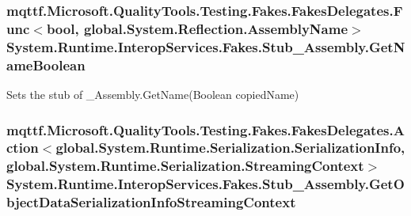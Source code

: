 \hypertarget{class_system_1_1_runtime_1_1_interop_services_1_1_fakes_1_1_stub___assembly_a039a10b8a1983925556ab1dda25231b8}{
\subsubsection[{Get\-Name\-Boolean}]{\setlength{\rightskip}{0pt plus 5cm}mqttf.\-Microsoft.\-Quality\-Tools.\-Testing.\-Fakes.\-Fakes\-Delegates.\-Func$<$bool, global.\-System.\-Reflection.\-Assembly\-Name$>$ System.\-Runtime.\-Interop\-Services.\-Fakes.\-Stub\-\_\-\-Assembly.\-Get\-Name\-Boolean}}\label{class_system_1_1_runtime_1_1_interop_services_1_1_fakes_1_1_stub___assembly_a039a10b8a1983925556ab1dda25231b8}


Sets the stub of \-\_\-\-Assembly.\-Get\-Name(\-Boolean copied\-Name)

\hypertarget{class_system_1_1_runtime_1_1_interop_services_1_1_fakes_1_1_stub___assembly_a97a43284d8c0ae3d29f00a837f759904}{
\subsubsection[{Get\-Object\-Data\-Serialization\-Info\-Streaming\-Context}]{\setlength{\rightskip}{0pt plus 5cm}mqttf.\-Microsoft.\-Quality\-Tools.\-Testing.\-Fakes.\-Fakes\-Delegates.\-Action$<$global.\-System.\-Runtime.\-Serialization.\-Serialization\-Info, global.\-System.\-Runtime.\-Serialization.\-Streaming\-Context$>$ System.\-Runtime.\-Interop\-Services.\-Fakes.\-Stub\-\_\-\-Assembly.\-Get\-Object\-Data\-Serialization\-Info\-Streaming\-Context}}\label{class_system_1_1_runtime_1_1_interop_services_1_1_fakes_1_1_stub___assembly_a97a43284d8c0ae3d29f00a837f759904}


